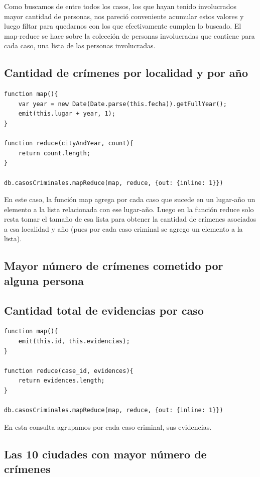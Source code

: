 \documentclass[10pt,a4paper]{article}
\begin{document}
Como buscamos de entre todos los casos, los que hayan tenido involucrados mayor cantidad de personas, nos pareció conveniente acumular estos valores y luego filtar para quedarnos con los que efectivamente cumplen lo buscado.
El map-reduce se hace sobre la colección de personas involucradas que contiene para cada caso, una lista de las personas involucradas.

\subsection{Cantidad de crímenes por localidad y por año}

\begin{lstlisting}
function map(){
	var year = new Date(Date.parse(this.fecha)).getFullYear();
	emit(this.lugar + year, 1);
}

function reduce(cityAndYear, count){
	return count.length;
}

db.casosCriminales.mapReduce(map, reduce, {out: {inline: 1}})
\end{lstlisting}

En este caso, la función map agrega por cada caso que sucede en un lugar-año un elemento a la lista relacionada con ese lugar-año. Luego en la función reduce solo resta tomar el tamaño de esa lista para obtener la cantidad de crímenes asociados a esa localidad y año (pues por cada caso criminal se agrego un elemento a la lista).

\subsection{Mayor número de crímenes cometido por alguna persona}

\subsection{Cantidad total de evidencias por caso}

\begin{lstlisting}
function map(){
	emit(this.id, this.evidencias);
}

function reduce(case_id, evidences){
	return evidences.length;
}

db.casosCriminales.mapReduce(map, reduce, {out: {inline: 1}})
\end{lstlisting}

En esta consulta agrupamos por cada caso criminal, sus evidencias.

\subsection{Las 10 ciudades con mayor número de crímenes}
\end{document}
